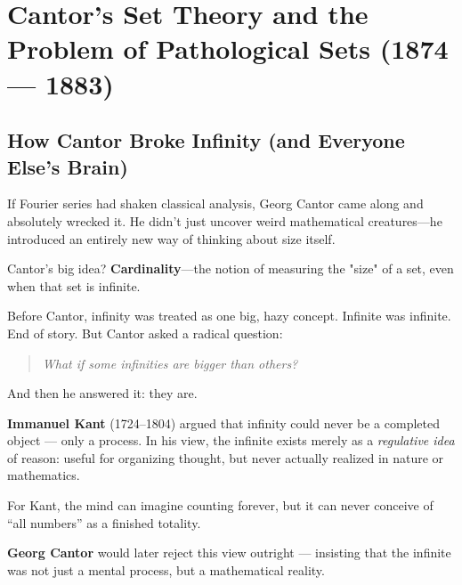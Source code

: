 \section{Cantor’s Set Theory and the Problem of Pathological Sets (1874 --- 1883)}

\subsection{How Cantor Broke Infinity (and Everyone Else's Brain)}

If Fourier series had shaken classical analysis, Georg Cantor came along and absolutely wrecked it. He didn’t just uncover weird mathematical creatures—he introduced an entirely new way of thinking about size itself. 

Cantor’s big idea? \textbf{Cardinality}—the notion of measuring the "size" of a set, even when that set is infinite.

Before Cantor, infinity was treated as one big, hazy concept. Infinite was infinite. End of story. But Cantor asked a radical question:

\begin{quote}
    \textit{What if some infinities are bigger than others?}
\end{quote}

And then he answered it: they are.


\begin{tcolorbox}[colback=gray!5!white, colframe=black!80!white, title={Historical Sidebar: Kant and the Limits of Infinity}]

  \textbf{Immanuel Kant} (1724–1804) argued that infinity could never be a completed object — only a process. In his view, the infinite exists merely as a \textit{regulative idea} of reason: useful for organizing thought, but never actually realized in nature or mathematics.
  
  For Kant, the mind can imagine counting forever, but it can never conceive of “all numbers” as a finished totality.
  
  \medskip
  
  \textbf{Georg Cantor} would later reject this view outright — insisting that the infinite was not just a mental process, but a mathematical reality.
  
\end{tcolorbox}
  


